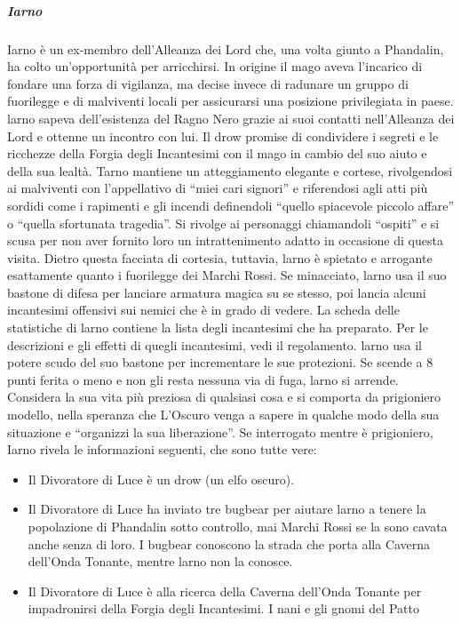 \documentclass{article}
\begin{document}
\begin{enumerate}
\subparagraph{Iarno}Iarno è un ex-membro dell'Alleanza dei Lord che, una volta
giunto a Phandalin, ha colto un'opportunità per arricchirsi.
In origine il mago aveva l’incarico di fondare una forza
di vigilanza, ma decise invece di radunare un gruppo di
fuorilegge e di malviventi locali per assicurarsi una posizione
privilegiata in paese.
larno sapeva dell'esistenza del Ragno Nero grazie ai suoi
contatti nell’Alleanza dei Lord e ottenne un incontro con lui.
Il drow promise di condividere i segreti e le ricchezze della
Forgia degli Incantesimi con il mago in cambio del suo aiuto e
della sua lealtà.
Tarno mantiene un atteggiamento
elegante e cortese, rivolgendosi ai
malviventi con l'appellativo di “miei
cari signori” e riferendosi agli atti più
sordidi come i rapimenti e gli incendi
definendoli “quello spiacevole piccolo
affare” o “quella sfortunata tragedia”.
Si rivolge ai personaggi chiamandoli
“ospiti” e si scusa per non aver fornito loro
un intrattenimento adatto in occasione
di questa visita. Dietro questa facciata
di cortesia, tuttavia, larno è spietato e
arrogante esattamente quanto i fuorilegge
dei Marchi Rossi.
Se minacciato, larno usa il suo bastone
di difesa per lanciare armatura magica su
se stesso, poi lancia alcuni incantesimi
offensivi sui nemici che è in grado di
vedere. La scheda delle statistiche di larno
contiene la lista degli incantesimi che ha
preparato. Per le descrizioni e gli effetti
di quegli incantesimi, vedi il regolamento.
larno usa il potere scudo del suo bastone
per incrementare le sue protezioni.
Se scende a 8 punti ferita o meno e
non gli resta nessuna via di fuga, larno
si arrende. Considera la sua vita più
preziosa di qualsiasi cosa e si comporta
da prigioniero modello, nella speranza che
L'Oscuro venga a sapere in qualche
modo della sua situazione e “organizzi la
sua liberazione”. Se interrogato mentre è prigioniero,
Iarno rivela le informazioni seguenti, che
sono tutte vere:
\begin{itemize}
    \item Il Divoratore di Luce è un drow (un elfo
oscuro).
    \item Il Divoratore di Luce ha inviato tre bugbear per
aiutare larno a tenere la popolazione di
Phandalin sotto controllo, mai Marchi
Rossi se la sono cavata anche senza di
loro. I bugbear conoscono la strada che
porta alla Caverna dell’Onda Tonante,
mentre larno non la conosce.
    \item Il Divoratore di Luce è alla ricerca della
Caverna dell’Onda Tonante per
impadronirsi della Forgia degli
Incantesimi. I nani e gli gnomi del Patto

\end{itemize}
\end{enumerate}
\end{document}
